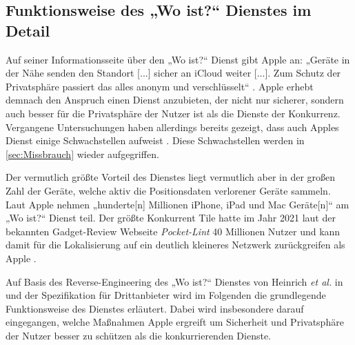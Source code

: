 \subsection{Funktionsweise des „Wo ist?“ Dienstes im Detail}
\label{sec:Funktionsweise_FindMy}
Auf seiner Informationsseite über den „Wo ist?“ Dienst gibt Apple an: „Geräte in der Nähe senden den Standort [...] sicher an iCloud weiter [...]. Zum Schutz der Privatsphäre passiert das alles anonym und verschlüsselt“ \cite{Apple_WoIst}.
Apple erhebt demnach den Anspruch einen Dienst anzubieten, der nicht nur sicherer, sondern auch besser für die Privatsphäre der Nutzer ist als die Dienste der Konkurrenz.
Vergangene Untersuchungen haben allerdings bereits gezeigt, dass auch Apples Dienst einige Schwachstellen aufweist \cite{Heinrich_FindMy,Tonetto_FindMy}.
Diese Schwachstellen werden in \autoref{sec:Missbrauch} wieder aufgegriffen.

Der vermutlich größte Vorteil des Dienstes liegt vermutlich aber in der großen Zahl der Geräte, welche aktiv die Positionsdaten verlorener Geräte sammeln.
Laut Apple nehmen „hunderte[n] Millionen iPhone, iPad und Mac Geräte[n]“ \cite{Apple_WoIst} am „Wo ist?“ Dienst teil.
Der größte Konkurrent Tile hatte im Jahr 2021 laut der bekannten Gadget-Review Webseite \textit{Pocket-Lint} 40 Millionen Nutzer und kann damit für die Lokalisierung auf ein deutlich kleineres Netzwerk zurückgreifen als Apple \cite{Tile_Network}.


Auf Basis des Reverse-Engineering des „Wo ist?“ Dienstes von Heinrich \textit{et al.} in \cite{Heinrich_FindMy} und der Spezifikation für Drittanbieter \cite{Apple_FindMySpec} wird im Folgenden die grundlegende Funktionsweise des Dienstes erläutert.
Dabei wird insbesondere darauf eingegangen, welche Maßnahmen Apple ergreift um Sicherheit und Privatsphäre der Nutzer besser zu schützen als die konkurrierenden Dienste. 


